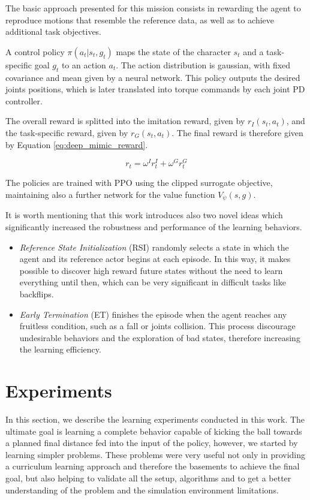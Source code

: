 The basic approach presented for this mission consists in rewarding the agent to reproduce motions that resemble the reference data, as well as to achieve additional task objectives.

A control policy $\pi (a_t|s_t,g_t)$ maps the state of the character $s_t$ and a task-specific goal $g_t$ to an action $a_t$. The action distribution is gaussian, with fixed covariance and mean given by a neural network. This policy outputs the desired joints positions, which is later translated into torque commands by each joint PD controller.

The overall reward is splitted into the imitation reward, given by $r_I(s_t,a_t)$, and the task-specific reward, given by $r_G(s_t,a_t)$. The final reward is therefore given by Equation \eqref{eq:deep_mimic_reward}.

\begin{equation}
r_t = \omega^I r_t^I + \omega^G r_t^G
\label{eq:deep_mimic_reward}
\end{equation}

The policies are trained with PPO using the clipped surrogate objective, maintaining also a further network for the value function $V_{\psi}(s,g)$.

It is worth mentioning that this work introduces also two novel ideas which significantly increased the robustness and performance of the learning behaviors. 

\begin{itemize}
\item \textit{Reference State Initialization} (RSI) randomly selects a state in which the agent and its reference actor begins at each episode. In this way, it makes possible to discover high reward future states without the need to learn everything until then, which can be very significant in difficult tasks like backflips.

\item \textit{Early Termination} (ET) finishes the episode when the agent reaches any fruitless condition, such as a fall or joints collision. This process discourage undesirable behaviors and the exploration of bad states, therefore increasing the learning efficiency.
\end{itemize}

\section{Experiments}

In this section, we describe the learning experiments conducted in this work. The ultimate goal is learning a complete behavior capable of kicking the ball towards a planned final distance fed into the input of the policy, however, we started by learning simpler problems. These problems were very useful not only in providing a curriculum learning approach \cite{BengioCurrLearning} and therefore the basements to achieve the final goal, but also helping to validate all the setup, algorithms and to get a better understanding of the problem and the simulation environment limitations.

